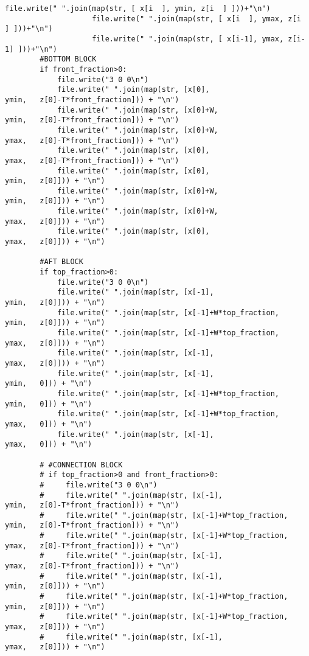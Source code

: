 \begin{mdframed}[backgroundcolor=light-gray, roundcorner=10pt,leftmargin=1, rightmargin=1, innerleftmargin=0, innertopmargin=7,innerbottommargin=0, outerlinewidth=1, linecolor=light-gray]
\begin{lstlisting}[linewidth=\columnwidth,caption=Functions used in setting up simulations ., label=script:setting up simulations]
                    file.write(" ".join(map(str, [ x[i  ], ymin, z[i  ] ]))+"\n")
                    file.write(" ".join(map(str, [ x[i  ], ymax, z[i  ] ]))+"\n")
                    file.write(" ".join(map(str, [ x[i-1], ymax, z[i-1] ]))+"\n")
        #BOTTOM BLOCK
        if front_fraction>0:
            file.write("3 0 0\n")
            file.write(" ".join(map(str, [x[0],                     ymin,   z[0]-T*front_fraction])) + "\n")
            file.write(" ".join(map(str, [x[0]+W,                   ymin,   z[0]-T*front_fraction])) + "\n")
            file.write(" ".join(map(str, [x[0]+W,                   ymax,   z[0]-T*front_fraction])) + "\n")
            file.write(" ".join(map(str, [x[0],                     ymax,   z[0]-T*front_fraction])) + "\n")
            file.write(" ".join(map(str, [x[0],                     ymin,   z[0]])) + "\n")
            file.write(" ".join(map(str, [x[0]+W,                   ymin,   z[0]])) + "\n")
            file.write(" ".join(map(str, [x[0]+W,                   ymax,   z[0]])) + "\n")
            file.write(" ".join(map(str, [x[0],                     ymax,   z[0]])) + "\n")

        #AFT BLOCK
        if top_fraction>0:
            file.write("3 0 0\n")
            file.write(" ".join(map(str, [x[-1],                    ymin,   z[0]])) + "\n")
            file.write(" ".join(map(str, [x[-1]+W*top_fraction,    ymin,   z[0]])) + "\n")
            file.write(" ".join(map(str, [x[-1]+W*top_fraction,    ymax,   z[0]])) + "\n")
            file.write(" ".join(map(str, [x[-1],                    ymax,   z[0]])) + "\n")
            file.write(" ".join(map(str, [x[-1],                    ymin,   0])) + "\n")
            file.write(" ".join(map(str, [x[-1]+W*top_fraction,    ymin,   0])) + "\n")
            file.write(" ".join(map(str, [x[-1]+W*top_fraction,    ymax,   0])) + "\n")
            file.write(" ".join(map(str, [x[-1],                    ymax,   0])) + "\n")

        # #CONNECTION BLOCK
        # if top_fraction>0 and front_fraction>0:
        #     file.write("3 0 0\n")
        #     file.write(" ".join(map(str, [x[-1],                    ymin,   z[0]-T*front_fraction])) + "\n")
        #     file.write(" ".join(map(str, [x[-1]+W*top_fraction,    ymin,   z[0]-T*front_fraction])) + "\n")
        #     file.write(" ".join(map(str, [x[-1]+W*top_fraction,    ymax,   z[0]-T*front_fraction])) + "\n")
        #     file.write(" ".join(map(str, [x[-1],                    ymax,   z[0]-T*front_fraction])) + "\n")
        #     file.write(" ".join(map(str, [x[-1],                    ymin,   z[0]])) + "\n")
        #     file.write(" ".join(map(str, [x[-1]+W*top_fraction,    ymin,   z[0]])) + "\n")
        #     file.write(" ".join(map(str, [x[-1]+W*top_fraction,    ymax,   z[0]])) + "\n")
        #     file.write(" ".join(map(str, [x[-1],                    ymax,   z[0]])) + "\n")
    

\end{lstlisting}
\end{mdframed}
